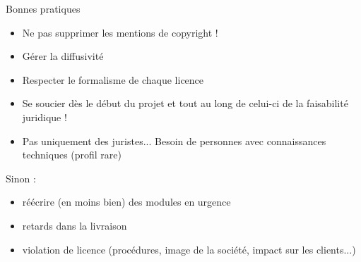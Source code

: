\documentclass{beamer}
\begin{document}
\begin{frame}{Bonnes pratiques}
  \begin{itemize}
  \item Ne pas supprimer les mentions de copyright !
  \item Gérer la diffusivité
  \item Respecter le formalisme de chaque licence
  \item Se soucier dès le début du projet et tout au long de celui-ci de la faisabilité juridique !
  \item Pas uniquement des juristes... Besoin de personnes avec connaissances techniques (profil rare)
  \end{itemize}
Sinon :
\begin{itemize}
\item réécrire (en moins bien) des modules en urgence
\item retards dans la livraison
\item violation de licence (procédures, image de la société, impact sur les clients...)
\end{itemize}
\end{frame}
\end{document}
